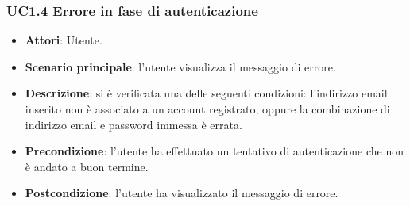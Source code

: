 \subsubsection{UC1.4 Errore in fase di autenticazione}
\begin{itemize}
\item \textbf{Attori}: Utente.
\item \textbf{Scenario principale}: l'utente visualizza il messaggio di errore.
\item \textbf{Descrizione}: si è verificata una delle seguenti condizioni: l'indirizzo email inserito non è associato a un account registrato, oppure la combinazione di indirizzo email e password immessa è errata.
\item \textbf{Precondizione}: l'utente ha effettuato un tentativo di autenticazione che non è andato a buon termine.
\item \textbf{Postcondizione}: l'utente ha visualizzato il messaggio di errore.
\end{itemize}
